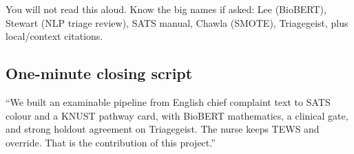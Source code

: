 \begin{whybox}
You will not read this aloud. Know the big names if asked: Lee (BioBERT), Stewart (NLP triage review),
SATS manual, Chawla (SMOTE), Triagegeist, plus local/context citations.
\end{whybox}

\subsection{One-minute closing script}

\begin{saybox}[Closing]
``We built an examinable pipeline from English chief complaint text to SATS colour and a KNUST pathway card,
with BioBERT mathematics, a clinical gate, and strong holdout agreement on Triagegeist.
The nurse keeps TEWS and override. That is the contribution of this project.''
\end{saybox}
